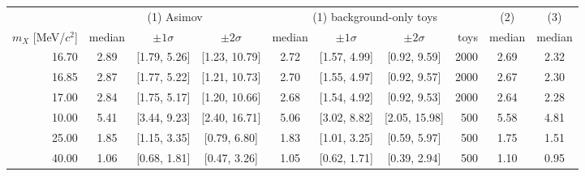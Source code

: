 \begin{tabular}{r ccc cccr cc}
\toprule
 & \multicolumn{3}{c}{(1) Asimov} & \multicolumn{4}{c}{(1) background-only toys} & (2) & (3) \\
$m_X$ [MeV/$c^2$] & median & $\pm1\sigma$ & $\pm2\sigma$ & median & $\pm1\sigma$ & $\pm2\sigma$ & toys & median & median \\
\midrule
16.70 & 2.89 & [1.79, 5.26] & [1.23, 10.79] & 2.72 & [1.57, 4.99] & [0.92, 9.59] & 2000 & 2.69 & 2.32 \\
16.85 & 2.87 & [1.77, 5.22] & [1.21, 10.73] & 2.70 & [1.55, 4.97] & [0.92, 9.57] & 2000 & 2.67 & 2.30 \\
17.00 & 2.84 & [1.75, 5.17] & [1.20, 10.66] & 2.68 & [1.54, 4.92] & [0.92, 9.53] & 2000 & 2.64 & 2.28 \\
10.00 & 5.41 & [3.44, 9.23] & [2.40, 16.71] & 5.06 & [3.02, 8.82] & [2.05, 15.98] & 500 & 5.58 & 4.81 \\
25.00 & 1.85 & [1.15, 3.35] & [0.79, 6.80] & 1.83 & [1.01, 3.25] & [0.59, 5.97] & 500 & 1.75 & 1.51 \\
40.00 & 1.06 & [0.68, 1.81] & [0.47, 3.26] & 1.05 & [0.62, 1.71] & [0.39, 2.94] & 500 & 1.10 & 0.95 \\
\bottomrule
\end{tabular}
